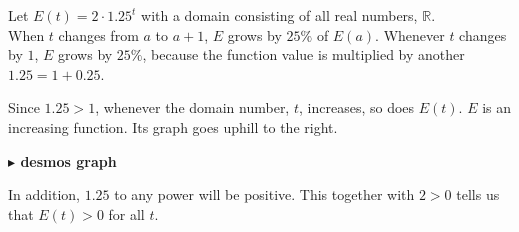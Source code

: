 \documentclass{ximera}
\begin{document}
\begin{example}

Let $E(t) = 2 \cdot 1.25^t$ with a domain consisting of all real numbers, $\mathbb{R}$. \\

When $t$ changes from $a$ to $a+1$, $E$ grows by $25\%$ of $E(a)$.  Whenever $t$ changes by $1$, $E$ grows by $25\%$, because the function value is multiplied by another $1.25 = 1 + 0.25$.


Since $1.25 > 1$, whenever the domain number, $t$, increases, so does $E(t)$.  $E$ is an increasing function.  Its graph goes uphill to the right.









\begin{image}
\end{image}







\begin{onlineOnly}
\textbf{\textcolor{blue!55!black}{$\blacktriangleright$ desmos graph}} 
\begin{center}
\end{center}
\end{onlineOnly}



In addition, $1.25$ to any power will be positive.  This together with $2>0$ tells us that $E(t) > 0$ for all $t$.


\end{example}
\end{document}
